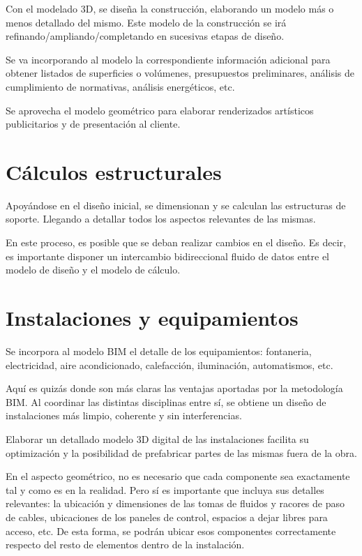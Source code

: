 \documentclass[spanish,12pt,a4paper,final,oneside]{book}
\begin{document}
Con el modelado 3D, se diseña la construcción, elaborando un modelo más o menos detallado del mismo. Este modelo de la construcción se irá refinando/ampliando/completando en sucesivas etapas de diseño.

Se va incorporando al modelo la correspondiente información adicional para obtener listados de superficies o volúmenes, presupuestos preliminares, análisis de cumplimiento de normativas, análisis energéticos, etc.

Se aprovecha el modelo geométrico para elaborar renderizados artísticos publicitarios y de presentación al cliente.

\section{Cálculos estructurales}
Apoyándose en el diseño inicial, se dimensionan y se calculan las estructuras de soporte. Llegando a detallar todos los aspectos relevantes de las mismas.

En este proceso, es posible que se deban realizar cambios en el diseño. Es decir, es importante disponer un intercambio bidireccional fluido de datos entre el modelo de diseño y el modelo de cálculo.

\section{Instalaciones y equipamientos}
Se incorpora al modelo BIM el detalle de los equipamientos: fontaneria, electricidad, aire acondicionado, calefacción, iluminación, automatismos, etc.

Aquí es quizás donde son más claras las ventajas aportadas por la metodología BIM. Al coordinar las distintas disciplinas entre sí, se obtiene un diseño de instalaciones más limpio, coherente y sin interferencias.

Elaborar un detallado modelo 3D digital de las instalaciones facilita su optimización y la posibilidad de prefabricar partes de las mismas fuera de la obra.

En el aspecto geométrico, no es necesario que cada componente sea exactamente tal y como es en la realidad. Pero sí es importante que incluya sus detalles relevantes: la ubicación y dimensiones de las tomas de fluidos y racores de paso de cables, ubicaciones de los paneles de control, espacios a dejar libres para acceso, etc. De esta forma, se podrán ubicar esos componentes correctamente respecto del resto de elementos dentro de la instalación.
\end{document}
